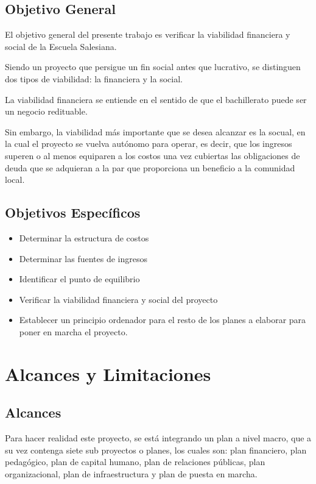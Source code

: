 \subsection{Objetivo General}
\label{sub:ObjetivoGeneral}

El objetivo general del presente trabajo es verificar la viabilidad financiera y social de la Escuela Salesiana.

Siendo un proyecto que persigue un fin social antes que lucrativo, se distinguen dos tipos de viabilidad: la financiera y la social.

La viabilidad financiera se entiende en el sentido de que el bachillerato puede
ser un negocio redituable.

Sin embargo, la viabilidad más importante que se desea alcanzar es la socual, en la cual el proyecto se vuelva autónomo para operar, es decir, que los ingresos superen o al menos equiparen a los costos una vez cubiertas las obligaciones de deuda que se adquieran a la par que proporciona un beneficio a la comunidad local.

\subsection{Objetivos Específicos}

\begin{itemize}
	\item Determinar la estructura de costos
	\item Determinar las fuentes de ingresos
	\item Identificar el punto de equilibrio
	\item Verificar la viabilidad financiera y social del proyecto
	\item Establecer un principio ordenador para el resto de los planes a elaborar para poner en marcha el proyecto.
\end{itemize}

\section{Alcances y Limitaciones}

\subsection{Alcances}

Para hacer realidad este proyecto, se está integrando un plan a nivel macro, que a su vez contenga siete sub proyectos o planes, los cuales son: plan financiero, plan pedagógico, plan de capital humano, plan de relaciones públicas, plan organizacional, plan de infraestructura y plan de puesta en marcha.

